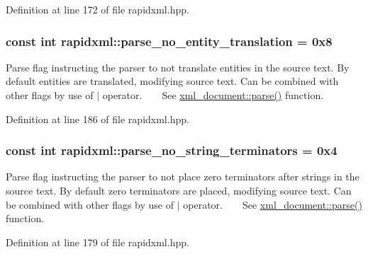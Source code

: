 Definition at line 172 of file rapidxml.\+hpp.

\subsubsection[{\texorpdfstring{parse\+\_\+no\+\_\+entity\+\_\+translation}{parse_no_entity_translation}}]{\setlength{\rightskip}{0pt plus 5cm}const int rapidxml\+::parse\+\_\+no\+\_\+entity\+\_\+translation = 0x8}\hypertarget{namespacerapidxml_a89113c103ffaf77615d1aa330c8dcca8}{}\label{namespacerapidxml_a89113c103ffaf77615d1aa330c8dcca8}
Parse flag instructing the parser to not translate entities in the source text. By default entities are translated, modifying source text. Can be combined with other flags by use of $\vert$ operator. ~\newline
~\newline
 See \hyperlink{classrapidxml_1_1xml__document_ac6e73ff9ac323bf5a370c38feb03a6b1}{xml\+\_\+document\+::parse()} function. 

Definition at line 186 of file rapidxml.\+hpp.

\subsubsection[{\texorpdfstring{parse\+\_\+no\+\_\+string\+\_\+terminators}{parse_no_string_terminators}}]{\setlength{\rightskip}{0pt plus 5cm}const int rapidxml\+::parse\+\_\+no\+\_\+string\+\_\+terminators = 0x4}\hypertarget{namespacerapidxml_af3fc88ba6bee33482a2db81b1da36ea1}{}\label{namespacerapidxml_af3fc88ba6bee33482a2db81b1da36ea1}
Parse flag instructing the parser to not place zero terminators after strings in the source text. By default zero terminators are placed, modifying source text. Can be combined with other flags by use of $\vert$ operator. ~\newline
~\newline
 See \hyperlink{classrapidxml_1_1xml__document_ac6e73ff9ac323bf5a370c38feb03a6b1}{xml\+\_\+document\+::parse()} function. 

Definition at line 179 of file rapidxml.\+hpp.

